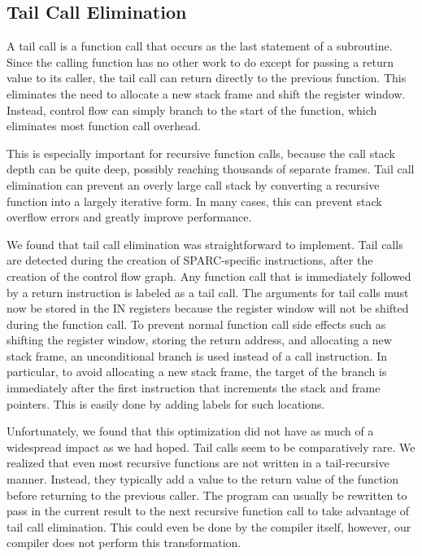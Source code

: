 \documentclass[12pt]{article}
\begin{document}
\subsection{Tail Call Elimination}
A tail call is a function call that occurs as the last statement of a subroutine.
Since the calling function has no other work to do except for passing a return value to its caller, the tail call can return directly to the previous function.
This eliminates the need to allocate a new stack frame and shift the register window.
Instead, control flow can simply branch to the start of the function, which eliminates most function call overhead.

This is especially important for recursive function calls, because the call stack depth can be quite deep, possibly reaching thousands of separate frames.
Tail call elimination can prevent an overly large call stack by converting a recursive function into a largely iterative form.
In many cases, this can prevent stack overflow errors and greatly improve performance.

We found that tail call elimination was straightforward to implement.
Tail calls are detected during the creation of SPARC-specific instructions, after the creation of the control flow graph.
Any function call that is immediately followed by a return instruction is labeled as a tail call.
The arguments for tail calls must now be stored in the IN registers because the register window will not be shifted during the function call.
To prevent normal function call side effects such as shifting the register window, storing the return address, and allocating a new stack frame, an unconditional branch is used instead of a call instruction.
In particular, to avoid allocating a new stack frame, the target of the branch is immediately after the first instruction that increments the stack and frame pointers.
This is easily done by adding labels for such locations.

Unfortunately, we found that this optimization did not have as much of a widespread impact as we had hoped.
Tail calls seem to be comparatively rare.
We realized that even most recursive functions are not written in a tail-recursive manner.
Instead, they typically add a value to the return value of the function before returning to the previous caller.
The program can usually be rewritten to pass in the current result to the next recursive function call to take advantage of tail call elimination.
This could even be done by the compiler itself, however, our compiler does not perform this transformation.
\end{document}
